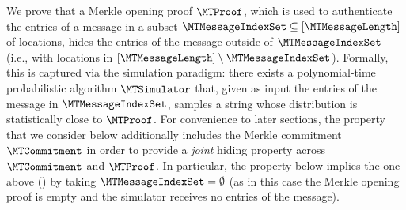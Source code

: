 We prove that a Merkle opening proof $\MTProof$, which is used to authenticate the entries of a message in a subset $\MTMessageIndexSet \subseteq [\MTMessageLength]$ of locations, hides the entries of the message outside of $\MTMessageIndexSet$ (i.e., with locations in $[\MTMessageLength] \setminus \MTMessageIndexSet$). Formally, this is captured via the simulation paradigm: there exists a polynomial-time probabilistic algorithm $\MTSimulator$ that, given as input the entries of the message in $\MTMessageIndexSet$, samples a string whose distribution is statistically close to $\MTProof$. For convenience to later sections, the property that we consider below additionally includes the Merkle commitment $\MTCommitment$ in order to provide a \emph{joint} hiding property across $\MTCommitment$ and $\MTProof$. In particular, the property below implies the one above () by taking $\MTMessageIndexSet=\emptyset$ (as in this case the Merkle opening proof is empty and the simulator receives no entries of the message).

